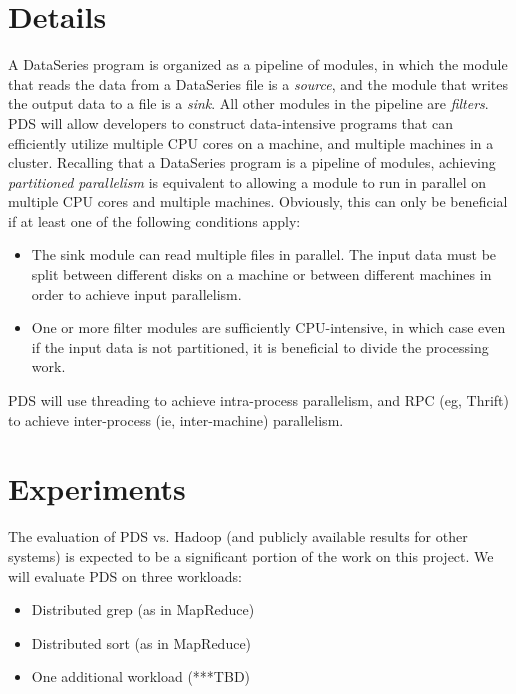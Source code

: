 \documentclass{acm_proc_article-sp}
\begin{document}
\section{Details}
A DataSeries program is organized as a pipeline of modules, in which the module that reads the data from a DataSeries file is a \emph{source}, and the module that writes the output data to a file is a \emph{sink}. All other modules in the pipeline are \emph{filters}.
PDS will allow developers to construct data-intensive programs that can efficiently utilize multiple CPU cores on a machine, and multiple machines in a cluster. Recalling that a DataSeries program is a pipeline of modules, achieving \emph{partitioned parallelism} \cite{paralleldatabases} is equivalent to allowing a module to run in parallel on multiple CPU cores and multiple machines. Obviously, this can only be beneficial if at least one of the following conditions apply:
\begin{itemize}
\item The sink module can read multiple files in parallel. The input data must be split between different disks on a machine or between different machines in order to achieve input parallelism.
\item One or more filter modules are sufficiently CPU-intensive, in which case even if the input data is not partitioned, it is beneficial to divide the processing work.
\end{itemize}
PDS will use threading to achieve intra-process parallelism, and RPC (eg, Thrift) to achieve inter-process (ie, inter-machine) parallelism.
\section{Experiments}
The evaluation of PDS vs. Hadoop (and publicly available results for other systems) is expected to be a significant portion of the work on this project. We will evaluate PDS on three workloads:
\begin{itemize}
\item Distributed grep (as in MapReduce)
\item Distributed sort (as in MapReduce)
\item One additional workload (***TBD)
\end{itemize}
\end{document}
